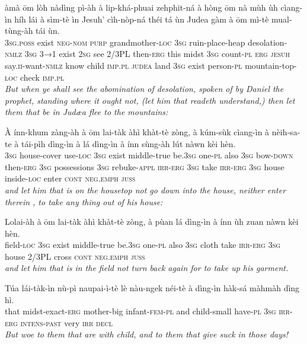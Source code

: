 \documentclass[11pt,a4paper]{article}
\begin{document}
\begin{exe}
\gll àmà ōm lòh nàdìng pì-àh à lip-khá-phuai zehphit-ná à hòng ōm nà mùh ùh cìang-ìn híh lái à sìm-tè ìn Jesuh' cìh-nòp-ná théi tá ùn Judea gàm à ōm mì-tè mual-tùng-àh tái ùn. \\
     \textsc{3sg}.\textsc{poss} exist \textsc{neg}-\textsc{nom} \textsc{purp} grandmother-\textsc{loc} \textsc{3sg} ruin-place-heap desolation-\textsc{nmlz} \textsc{3sg} \textsc{3→1} exist \textsc{2sg} see 2/3PL then-\textsc{erg} this midst \textsc{3sg} count-\textsc{pl} \textsc{erg} \textsc{jesuh} say.\textsc{ii}-want-\textsc{nmlz} know child \textsc{imp}.\textsc{pl} \textsc{judea} land \textsc{3sg} exist person-\textsc{pl} mountain-top-\textsc{loc} check \textsc{imp}.\textsc{pl} \\
\glt \textcolor{kjvcolor}{\textit{But when ye shall see the abomination of desolation, spoken of by Daniel the prophet, standing where it ought not, (let him that readeth understand,) then let them that be in Judæa flee to the mountains:}}

\gll À ínn-khum zàng-àh à ōm lai-tàk àhì khàt-tè zòng, à kúm-sùk cìang-ìn à nèih-sa-te à tái-pìh dìng-ìn à lá dìng-ìn à ínn sùng-àh lút nàwn kèi hèn. \\
     \textsc{3sg} house-cover use-\textsc{loc} \textsc{3sg} exist middle-true be.\textsc{3sg} one-\textsc{pl} also \textsc{3sg} bow-\textsc{down} then-\textsc{erg} \textsc{3sg} possessions \textsc{3sg} rebuke-\textsc{appl} \textsc{irr}-\textsc{erg} \textsc{3sg} take \textsc{irr}-\textsc{erg} \textsc{3sg} house inside-\textsc{loc} enter \textsc{cont} \textsc{neg}.\textsc{emph} \textsc{juss} \\
\glt \textcolor{kjvcolor}{\textit{and let him that is on the housetop not go down into the house, neither enter therein , to take any thing out of his house:}}

\gll Lolai-àh à ōm lai-tàk àhì khàt-tè zòng, à pùan lá dìng-ìn à ínn ùh zuan nàwn kèi hèn. \\
     field-\textsc{loc} \textsc{3sg} exist middle-true be.\textsc{3sg} one-\textsc{pl} also \textsc{3sg} cloth take \textsc{irr}-\textsc{erg} \textsc{3sg} house 2/3PL cross \textsc{cont} \textsc{neg}.\textsc{emph} \textsc{juss} \\
\glt \textcolor{kjvcolor}{\textit{and let him that is in the field not turn back again for to take up his garment.}}

\gll Túa lái-tàk-ìn nù-pì naupai-ì-tè lè nàu-ngek néi-tè à dìng-ìn hàk-sá màhmàh dìng hì. \\
     that midst-exact-\textsc{erg} mother-big infant-\textsc{fem}-\textsc{pl} and child-small have-\textsc{pl} \textsc{3sg} \textsc{irr}-\textsc{erg} \textsc{intens}-\textsc{past} very \textsc{irr} \textsc{decl} \\
\glt \textcolor{kjvcolor}{\textit{But woe to them that are with child, and to them that give suck in those days!}}


\end{exe}
\end{document}
